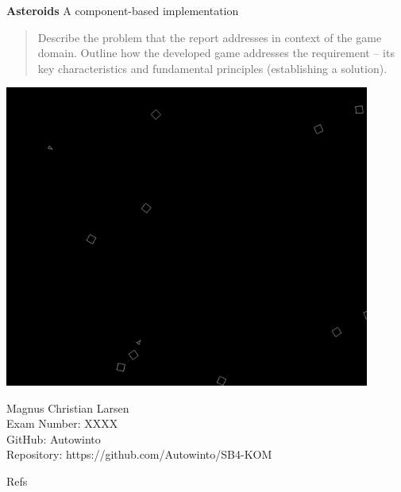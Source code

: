 \documentclass{article}
\begin{document}
\begin{titlepage}
    \begin{center}
        \vspace*{1cm}
        \Huge
        \textbf{Asteroids}
        \vspace{0.5cm}
        \LARGE
        A component-based implementation
        \begin{abstract}
            Describe the problem that the report addresses in context of the 
            game domain.
            Outline how the developed game addresses the requirement – its key 
            characteristics and fundamental principles 
            (establishing a solution).

        \end{abstract}
        \includegraphics[width=12cm]{images/Asteroids}
    \end{center}


    \begin{center}
        Magnus Christian Larsen \\
        Exam Number: XXXX \\
        GitHub: Autowinto\\
        Repository: https://github.com/Autowinto/SB4-KOM\\
    \end{center}
\end{titlepage}

\tableofcontents












Refs
\end{document}
